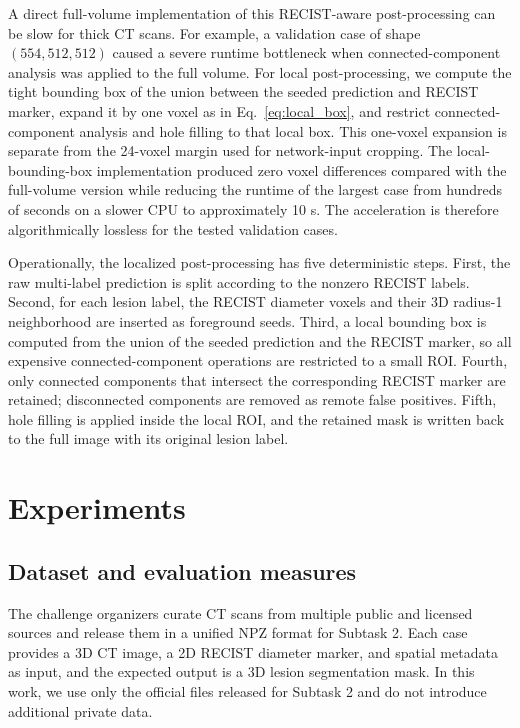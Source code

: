 \documentclass[runningheads]{llncs}
\begin{document}
A direct full-volume implementation of this RECIST-aware post-processing can be slow for thick CT scans. For example, a validation case of shape $(554,512,512)$ caused a severe runtime bottleneck when connected-component analysis was applied to the full volume. For local post-processing, we compute the tight bounding box of the union between the seeded prediction and RECIST marker, expand it by one voxel as in Eq.~\eqref{eq:local_box}, and restrict connected-component analysis and hole filling to that local box. This one-voxel expansion is separate from the 24-voxel margin used for network-input cropping. The local-bounding-box implementation produced zero voxel differences compared with the full-volume version while reducing the runtime of the largest case from hundreds of seconds on a slower CPU to approximately 10 s. The acceleration is therefore algorithmically lossless for the tested validation cases.

Operationally, the localized post-processing has five deterministic steps. First, the raw multi-label prediction is split according to the nonzero RECIST labels. Second, for each lesion label, the RECIST diameter voxels and their 3D radius-1 neighborhood are inserted as foreground seeds. Third, a local bounding box is computed from the union of the seeded prediction and the RECIST marker, so all expensive connected-component operations are restricted to a small ROI. Fourth, only connected components that intersect the corresponding RECIST marker are retained; disconnected components are removed as remote false positives. Fifth, hole filling is applied inside the local ROI, and the retained mask is written back to the full image with its original lesion label.

\section{Experiments}
\label{sec:experiments}

\subsection{Dataset and evaluation measures}
\label{sec:dataset}

The challenge organizers curate CT scans from multiple public and licensed sources and release them in a unified NPZ format for Subtask 2. Each case provides a 3D CT image, a 2D RECIST diameter marker, and spatial metadata as input, and the expected output is a 3D lesion segmentation mask. In this work, we use only the official files released for Subtask 2 and do not introduce additional private data.
\end{document}
